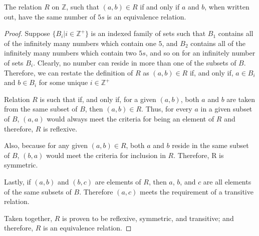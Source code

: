 
\begin{theorem}
  The relation $R$ on $\mathbb{Z}$, such that $(a,b)\in R$ if and only if $a$
  and $b$, when written out, have the same number of $5s$ is an equivalence
  relation.
\end{theorem}

\begin{proof}
  Suppose $\{B_i|i\in \mathbb{Z}^+\}$ is an indexed family of sets such that
  $B_1$ contains all of the infinitely many numbers which contain one $5$, and
  $B_2$ contains all of the infinitely many numbers which contain two $5s$,
  and so on for an infinitely number of sets $B_i$. Clearly, no number can
  reside in more than one of the subsets of $B$. Therefore, we can restate the
  definition of $R$ as $(a,b) \in R$ if, and only if, $a \in B_i$ and $b \in
  B_i$ for some unique $i \in \mathbb{Z}^+$

  Relation $R$ is such that if, and only if, for a given $(a,b)$, both $a$ and
  $b$ are taken from the same subset of $B$, then $(a,b) \in R$. Thus, for
  every $a$ in a given subset of $B$, $(a,a)$ would always meet the criteria
  for being an element of $R$ and therefore, $R$ is reflexive.

  Also, because for any given $(a,b) \in R$, both $a$ and $b$ reside in the same
  subset of $B$, $(b,a)$ would meet the criteria for inclusion in $R$.
  Therefore, R is symmetric.

  Lastly, if $(a,b)$ and $(b,c)$ are elements of $R$, then $a$, $b$, and $c$ are
  all elements of the same subsets of $B$. Therefore $(a,c)$ meets the
  requirement of a transitive relation.

  Taken together, $R$ is proven to be reflexive, symmetric, and transitive; and
  therefore, $R$ is an equivalence relation.
\end{proof}
